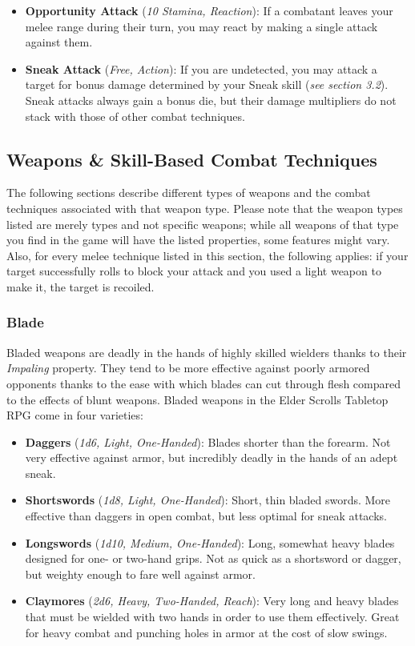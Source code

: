 \begin{itemize}
	\item \textbf{Opportunity Attack} (\textit{10 Stamina, Reaction}): If a combatant leaves your melee range during their turn, you may react by making a single attack against them.
	\item \textbf{Sneak Attack} (\textit{Free, Action}): If you are undetected, you may attack a target for bonus damage determined by your Sneak skill (\textit{see section 3.2}). Sneak attacks always gain a bonus die, but their damage multipliers do not stack with those of other combat techniques.
\end{itemize}

\subsection{Weapons \& Skill-Based Combat Techniques}

The following sections describe different types of weapons and the combat techniques associated with that weapon type. Please note that the weapon types listed are merely types and not specific weapons; while all weapons of that type you find in the game will have the listed properties, some features might vary. Also, for every melee technique listed in this section, the following applies: if your target successfully rolls to block your attack and you used a light weapon to make it, the target is recoiled.

\subsubsection{Blade}

Bladed weapons are deadly in the hands of highly skilled wielders thanks to their \textit{Impaling} property. They tend to be more effective against poorly armored opponents thanks to the ease with which blades can cut through flesh compared to the effects of blunt weapons. Bladed weapons in the Elder Scrolls Tabletop RPG come in four varieties:

\begin{itemize}
	\item \textbf{Daggers} (\textit{1d6, Light, One-Handed}): Blades shorter than the forearm. Not very effective against armor, but incredibly deadly in the hands of an adept sneak.
	\item \textbf{Shortswords} (\textit{1d8, Light, One-Handed}): Short, thin bladed swords. More effective than daggers in open combat, but less optimal for sneak attacks.
	\item \textbf{Longswords} (\textit{1d10, Medium, One-Handed}): Long, somewhat heavy blades designed for one- or two-hand grips. Not as quick as a shortsword or dagger, but weighty enough to fare well against armor.
	\item \textbf{Claymores} (\textit{2d6, Heavy, Two-Handed, Reach}): Very long and heavy blades that must be wielded with two hands in order to use them effectively. Great for heavy combat and punching holes in armor at the cost of slow swings.
\end{itemize}

